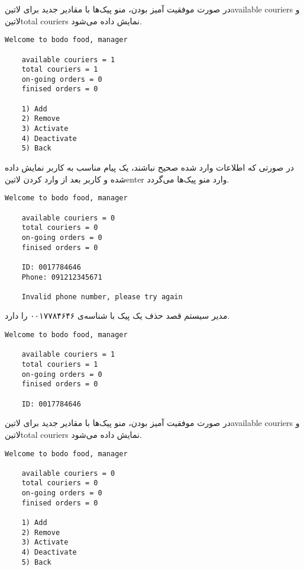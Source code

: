 \documentclass[../main.tex]{subfiles}
\begin{document}
در صورت موفقیت آمیز بودن، منو پیک‌ها با مقادیر جدید برای ‌لاتین{available couriers} و ‌لاتین{total couriers} نمایش داده می‌شود.

\begin{latin}
\begin{lstlisting}[]
    Welcome to bodo food, manager

    available couriers = 1
    total couriers = 1
    on-going orders = 0
    finised orders = 0

    1) Add
    2) Remove
    3) Activate
    4) Deactivate
    5) Back
\end{lstlisting}
\end{latin}

در صورتی که اطلاعات وارد شده صحیح نباشند، یک پیام مناسب به کاربر نمایش داده شده و کاربر بعد از وارد کردن ‌لاتین{enter} وارد منو پیک‌ها می‌گردد.

\begin{latin}
\begin{lstlisting}[]
    Welcome to bodo food, manager

    available couriers = 0
    total couriers = 0
    on-going orders = 0
    finised orders = 0

    ID: 0017784646
    Phone: 091212345671

    Invalid phone number, please try again
\end{lstlisting}
\end{latin}

مدیر سیستم قصد حذف یک پیک با شناسه‌ی ۰۰۱۷۷۸۴۶۴۶ را دارد.

\begin{latin}
\begin{lstlisting}[]
    Welcome to bodo food, manager

    available couriers = 1
    total couriers = 1
    on-going orders = 0
    finised orders = 0

    ID: 0017784646

\end{lstlisting}
\end{latin}

در صورت موفقیت آمیز بودن، منو پیک‌ها با مقادیر جدید برای ‌لاتین{available couriers} و ‌لاتین{total couriers} نمایش داده می‌شود.

\begin{latin}
\begin{lstlisting}[]
    Welcome to bodo food, manager

    available couriers = 0
    total couriers = 0
    on-going orders = 0
    finised orders = 0

    1) Add
    2) Remove
    3) Activate
    4) Deactivate
    5) Back
\end{lstlisting}
\end{latin}
\end{document}
